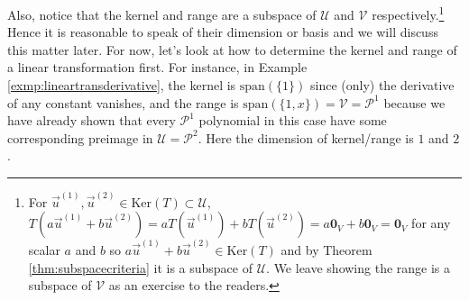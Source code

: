 Also, notice that the kernel and range are a subspace of $\mathcal{U}$ and $\mathcal{V}$ respectively.\footnote{For $\vec{u}^{(1)}, \vec{u}^{(2)} \in \text{Ker}(T) \subset \mathcal{U}$, $T(a\vec{u}^{(1)} + b\vec{u}^{(2)}) = aT(\vec{u}^{(1)}) + bT(\vec{u}^{(2)}) = a\textbf{0}_V + b\textbf{0}_V = \textbf{0}_V$ for any scalar $a$ and $b$ so $a\vec{u}^{(1)} + b\vec{u}^{(2)} \in \text{Ker}(T)$ and by Theorem \ref{thm:subspacecriteria} it is a subspace of $\mathcal{U}$. We leave showing the range is a subspace of $\mathcal{V}$ as an exercise to the readers.} Hence it is reasonable to speak of their dimension or basis and we will discuss this matter later. For now, let's look at how to determine the kernel and range of a linear transformation first. For instance, in Example \ref{exmp:lineartransderivative}, the kernel is $\text{span}(\{1\})$ since (only) the derivative of any constant vanishes, and the range is $\text{span}(\{1, x\}) = \mathcal{V} = \mathcal{P}^1$ because we have already shown that every $\mathcal{P}^1$ polynomial in this case have some corresponding preimage in $\mathcal{U} = \mathcal{P}^2$. Here the dimension of kernel/range is $1$ and $2$.

